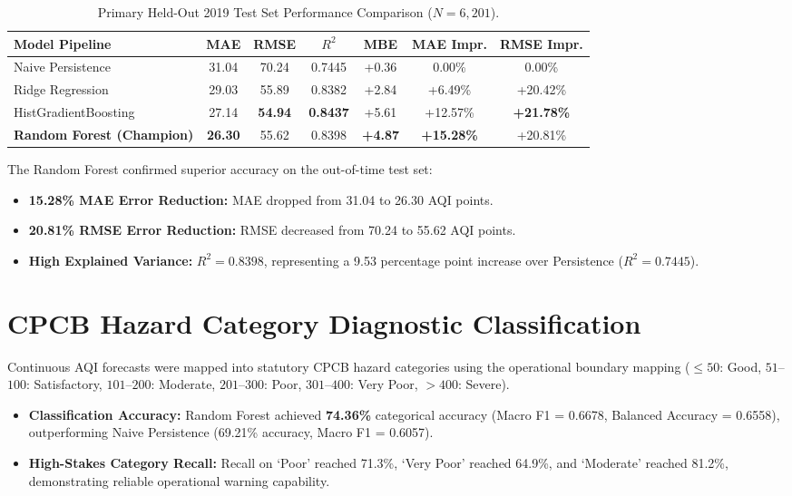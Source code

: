 \documentclass[11pt,a4paper]{report}
\begin{document}
\begin{table}[htbp]
\centering
\small
\caption{Primary Held-Out 2019 Test Set Performance Comparison ($N=6,201$).}
\label{tab:test_metrics}
\begin{tabularx}{\textwidth}{>{\raggedright\arraybackslash}Xcccccc}
\toprule
\textbf{Model Pipeline} & \textbf{MAE} & \textbf{RMSE} & \textbf{$R^2$} & \textbf{MBE} & \textbf{MAE Impr.} & \textbf{RMSE Impr.} \\
\midrule
Naive Persistence & 31.04 & 70.24 & 0.7445 & +0.36 & 0.00\% & 0.00\% \\
Ridge Regression & 29.03 & 55.89 & 0.8382 & +2.84 & +6.49\% & +20.42\% \\
HistGradientBoosting & 27.14 & \textbf{54.94} & \textbf{0.8437} & +5.61 & +12.57\% & \textbf{+21.78\%} \\
\textbf{Random Forest (Champion)} & \textbf{26.30} & 55.62 & 0.8398 & \textbf{+4.87} & \textbf{+15.28\%} & +20.81\% \\
\bottomrule
\end{tabularx}
\end{table}

The Random Forest confirmed superior accuracy on the out-of-time test set:
\begin{itemize}
    \item \textbf{15.28\% MAE Error Reduction:} MAE dropped from 31.04 to 26.30 AQI points.
    \item \textbf{20.81\% RMSE Error Reduction:} RMSE decreased from 70.24 to 55.62 AQI points.
    \item \textbf{High Explained Variance:} $R^2 = 0.8398$, representing a 9.53 percentage point increase over Persistence ($R^2 = 0.7445$).
\end{itemize}

\section{CPCB Hazard Category Diagnostic Classification}
Continuous AQI forecasts were mapped into statutory CPCB hazard categories using the operational boundary mapping ($\le 50$: Good, $51$--$100$: Satisfactory, $101$--$200$: Moderate, $201$--$300$: Poor, $301$--$400$: Very Poor, $>400$: Severe).
\begin{itemize}
    \item \textbf{Classification Accuracy:} Random Forest achieved \textbf{74.36\%} categorical accuracy (Macro F1 = 0.6678, Balanced Accuracy = 0.6558), outperforming Naive Persistence (69.21\% accuracy, Macro F1 = 0.6057).
    \item \textbf{High-Stakes Category Recall:} Recall on `Poor' reached 71.3\%, `Very Poor' reached 64.9\%, and `Moderate' reached 81.2\%, demonstrating reliable operational warning capability.
\end{itemize}
\end{document}

